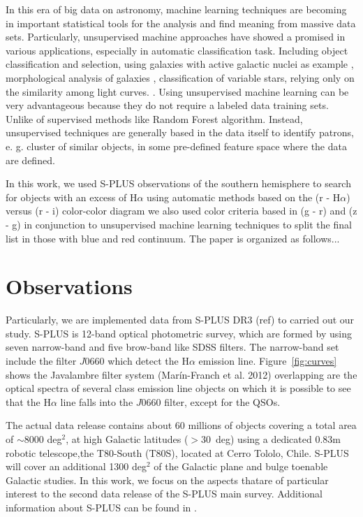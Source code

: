 \documentclass[fleqn,usenatbib]{mnras}
\begin{document}
In this era of big data on astronomy, machine learning techniques are becoming
in important statistical tools for the analysis and find meaning from massive
data sets. Particularly, unsupervised machine approaches have showed a promised
in various applications, especially in automatic classification task. Including
object classification and selection, using galaxies with active galactic nuclei
as example \citep{Geach:2012}, morphological analysis of galaxies \citep{Martin:2020},
classification of variable stars, relying only on the similarity among light
curves. \citep{Valenzuela:2018}. Using unsupervised machine
learning can be very advantageous because they do not require a labeled data
training sets. Unlike of supervised methods like Random Forest algorithm.
Instead, unsupervised techniques are generally based in the data itself to
identify patrons, e. g. cluster of similar objects, in some pre-defined
feature space where the data are defined.

In this work, we used S-PLUS observations of the southern hemisphere to search
for objects with an excess of H{$\alpha$} using automatic methods based on the
(r - H$\alpha$) versus (r - i) color-color diagram we also used color criteria
based in (g - r) and (z - g) in conjunction to unsupervised machine learning
techniques to split the final list in those with blue and red continuum. The
paper is organized as follows...

\section{Observations}
\label{sec:obser}

Particularly, we are implemented data from S-PLUS DR3 (ref) to carried out our
study. S-PLUS is 12-band optical photometric survey, which are formed by using
seven narrow-band and five brow-band like SDSS filters. The narrow-band set
include the filter $J$0660 which detect the H{$\alpha$} emission line.
Figure~\ref{fig:curves} shows the Javalambre filter system (Marín-Franch et al. 2012)
overlapping are the optical spectra of several class emission line objects on which
it is possible to see that the H{$\alpha$} line falls into the $J$0660 filter, except
for the QSOs.   

The actual data release contains about 60 millions of objects covering a total
area of $\sim$8000 deg$^2$, at high Galactic latitudes ($ > 30$~deg) using a
dedicated 0.83m robotic telescope,the T80-South (T80S), located at Cerro Tololo,
Chile. S-PLUS will cover an additional 1300 deg$^2$ of the Galactic plane and bulge
toenable Galactic studies. In this work, we focus on the aspects thatare of
particular interest to the second data release of the S-PLUS main survey.
Additional information about S-PLUS can be found in \citet{Mendes:2019}. 
\end{document}

